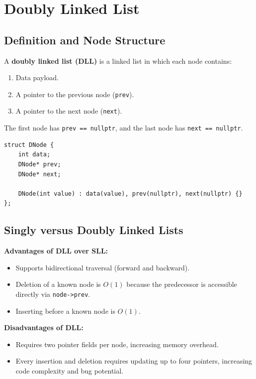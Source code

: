 \section{Doubly Linked List}

\subsection{Definition and Node Structure}

A \textbf{doubly linked list (DLL)} is a linked list in which each node contains:
\begin{enumerate}
    \item Data payload.
    \item A pointer to the previous node (\texttt{prev}).
    \item A pointer to the next node (\texttt{next}).
\end{enumerate}

The first node has \texttt{prev == nullptr}, and the last node has \texttt{next == nullptr}.

\begin{lstlisting}[style=cppstyle]
struct DNode {
    int data;
    DNode* prev;
    DNode* next;

    DNode(int value) : data(value), prev(nullptr), next(nullptr) {}
};
\end{lstlisting}

\subsection{Singly versus Doubly Linked Lists}

\textbf{Advantages of DLL over SLL:}
\begin{itemize}
    \item Supports bidirectional traversal (forward and backward).
    \item Deletion of a known node is $O(1)$ because the predecessor is accessible directly via \texttt{node->prev}.
    \item Inserting before a known node is $O(1)$.
\end{itemize}

\textbf{Disadvantages of DLL:}
\begin{itemize}
    \item Requires two pointer fields per node, increasing memory overhead.
    \item Every insertion and deletion requires updating up to four pointers, increasing code complexity and bug potential.
\end{itemize}

